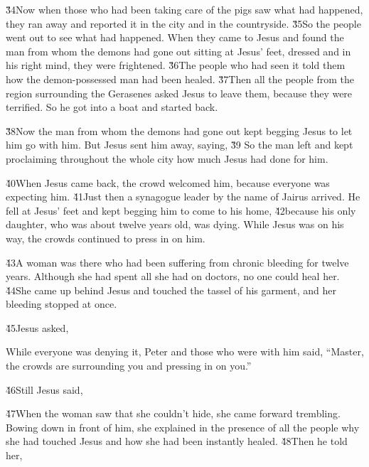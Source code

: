\v{34}Now when those who had been taking care of the pigs saw what had happened, they ran away and reported it in the city and in the countryside. \v{35}So the people went out to see what had happened. When they came to Jesus and found the man from whom the demons had gone out sitting at Jesus' feet, dressed and in his right mind, they were frightened. \v{36}The people who had seen it told them how the demon-possessed man had been healed. \v{37}Then all the people from the region surrounding the Gerasenes asked Jesus to leave them, because they were terrified. So he got into a boat and started back.

\v{38}Now the man from whom the demons had gone out kept begging Jesus to let him go with him. But Jesus sent him away, saying, \v{39} So the man left and kept proclaiming throughout the whole city how much Jesus had done for him.

\v{40}When Jesus came back, the crowd welcomed him, because everyone was expecting him. \v{41}Just then a synagogue leader by the name of Jairus arrived. He fell at Jesus' feet and kept begging him to come to his home, \v{42}because his only daughter, who was about twelve years old, was dying. While Jesus was on his way, the crowds continued to press in on him.

\v{43}A woman was there who had been suffering from chronic bleeding for twelve years. Although she had spent all she had on doctors, no one could heal her. \v{44}She came up behind Jesus and touched the tassel of his garment, and her bleeding stopped at once.

\v{45}Jesus asked, 

While everyone was denying it, Peter and those who were with him said, ``Master, the crowds are surrounding you and pressing in on you.''

\v{46}Still Jesus said, 

\v{47}When the woman saw that she couldn't hide, she came forward trembling. Bowing down in front of him, she explained in the presence of all the people why she had touched Jesus and how she had been instantly healed. \v{48}Then he told her, 

